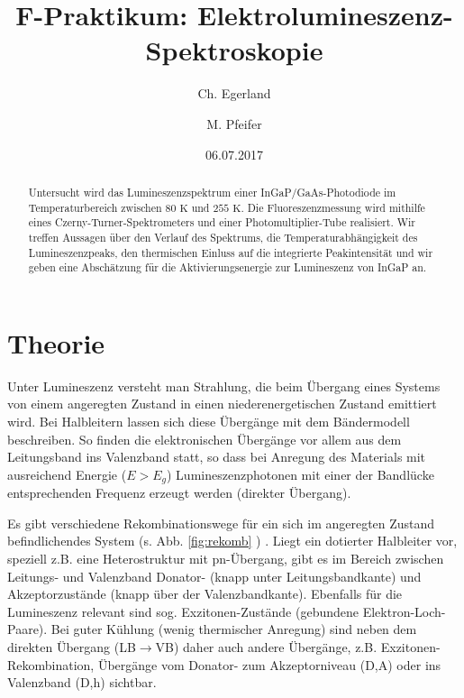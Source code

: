 \documentclass[aps,twocolumn,secnumarabic,nobalancelastpage,amsmath,amssymb,
nofootinbib,superscriptaddress]{revtex4-1}
\begin{document}
\title{F-Praktikum: Elektrolumineszenz-Spektroskopie}
\author         {Ch. Egerland}
\author         {M. Pfeifer}
\date[Versuchsdatum: ]{06.07.2017}

\begin{abstract}
Untersucht wird das Lumineszenzspektrum einer InGaP/GaAs-Photodiode im Temperaturbereich zwischen
$80\text{ K}$ und $255\text{ K}$. Die Fluoreszenzmessung wird mithilfe eines Czerny-Turner-Spektrometers
und einer Photomultiplier-Tube realisiert. Wir treffen Aussagen über den Verlauf des Spektrums, die
Temperaturabhängigkeit des Lumineszenzpeaks, den thermischen Einluss auf die integrierte Peakintensität und
wir geben eine Abschätzung für die Aktivierungsenergie zur Lumineszenz von InGaP an.
\end{abstract}


\maketitle



\section{Theorie}

\noindent Unter Lumineszenz versteht man Strahlung, die beim Übergang eines Systems von einem angeregten Zustand
in einen niederenergetischen Zustand emittiert wird. Bei Halbleitern lassen sich diese Übergänge mit dem Bändermodell
beschreiben. So finden die elektronischen Übergänge vor allem aus dem Leitungsband ins Valenzband statt, so dass bei
Anregung des Materials mit ausreichend Energie ($E>E_g$) Lumineszenzphotonen mit einer der Bandlücke entsprechenden
Frequenz erzeugt werden (direkter Übergang).\newline

\noindent Es gibt verschiedene Rekombinationswege für ein sich im angeregten Zustand befindlichendes System (s. Abb. \ref{fig:rekomb} ) \cite{saarland}.
Liegt ein dotierter Halbleiter vor, speziell z.B. eine Heterostruktur mit pn-Übergang, gibt es im Bereich zwischen Leitungs-
und Valenzband Donator- (knapp unter Leitungsbandkante) und Akzeptorzustände (knapp über der Valenzbandkante). Ebenfalls für die
Lumineszenz relevant sind sog. Exzitonen-Zustände (gebundene Elektron-Loch-Paare). Bei guter Kühlung (wenig thermischer
Anregung) sind neben dem direkten Übergang (LB$\rightarrow$VB) daher auch andere Übergänge, z.B. Exzitonen-Rekombination,
Übergänge vom Donator- zum Akzeptorniveau (D,A) oder ins Valenzband (D,h) sichtbar.
\end{document}
